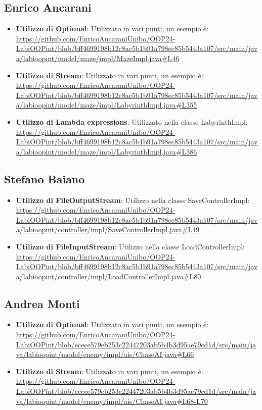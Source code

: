\documentclass[a4paper,12pt]{report}
\begin{document}
\subsection{Enrico Ancarani}
\begin{itemize}
	\item \textbf{Utilizzo di Optional}: Utilizzato in vari punti, un esempio è: \url{https://github.com/EnricoAncaraniUnibo/OOP24-LabiOOPint/blob/bff4699198b12c8ac5b1b91a798ec85b5443a107/src/main/java/labioopint/model/maze/impl/MazeImpl.java#L46}
	\item \textbf{Utilizzo di Stream}: Utilizzato in vari punti, un esempio è: \url{https://github.com/EnricoAncaraniUnibo/OOP24-LabiOOPint/blob/bff4699198b12c8ac5b1b91a798ec85b5443a107/src/main/java/labioopint/model/maze/impl/LabyrinthImpl.java#L355}
	\item \textbf{Utilizzo di Lambda expressions}: Utilizzato nella classe LabyrinthImpl: \url{https://github.com/EnricoAncaraniUnibo/OOP24-LabiOOPint/blob/bff4699198b12c8ac5b1b91a798ec85b5443a107/src/main/java/labioopint/model/maze/impl/LabyrinthImpl.java#L386}
\end{itemize}

\subsection{Stefano Baiano}
\begin{itemize}
	\item \textbf{Utilizzo di FileOutputStream}: Utilizzo nella classe SaveControllerImpl: \url{https://github.com/EnricoAncaraniUnibo/OOP24-LabiOOPint/blob/bff4699198b12c8ac5b1b91a798ec85b5443a107/src/main/java/labioopint/controller/impl/SaveControllerImpl.java#L49}
	\item \textbf{Utilizzo di FileInputStream}: Utilizzo nella classe LoadControllerImpl: \url{https://github.com/EnricoAncaraniUnibo/OOP24-LabiOOPint/blob/bff4699198b12c8ac5b1b91a798ec85b5443a107/src/main/java/labioopint/controller/impl/LoadControllerImpl.java#L80}
\end{itemize}

\subsection{Andrea Monti}
\begin{itemize}
	\item \textbf{Utilizzo di Optional}: Utilizzato in vari punti, un esempio è: \url{https://github.com/EnricoAncaraniUnibo/OOP24-LabiOOPint/blob/ecece579eb253c22447203ab5b4b3d95ae79cd1d/src/main/java/labioopint/model/enemy/impl/ais/ChaseAI.java#L66}
	\item \textbf{Utilizzo di Stream}: Utilizzato in vari punti, un esempio è: \url{https://github.com/EnricoAncaraniUnibo/OOP24-LabiOOPint/blob/ecece579eb253c22447203ab5b4b3d95ae79cd1d/src/main/java/labioopint/model/enemy/impl/ais/ChaseAI.java#L68-L70}
\end{itemize}
\end{document}
